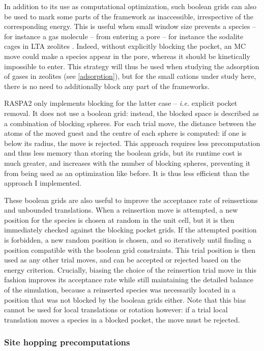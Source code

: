 \documentclass[main.tex]{subfiles}
\begin{document}
In addition to its use as computational optimization, such boolean grids can also be used to mark some parts of the framework as inaccessible, irrespective of the corresponding energy. This is useful when small window size prevents a species -- for instance a gas molecule -- from entering a pore -- for instance the sodalite cages in LTA zeolites \autocite{PoreBlocking}. Indeed, without explicitly blocking the pocket, an MC move could make a species appear in the pore, whereas it should be kinetically impossible to enter. This strategy will thus be used when studying the adsorption of gases in zeolites (see \cref{adsorption}), but for the small cations under study here, there is no need to additionally block any part of the frameworks.

RASPA2 only implements blocking for the latter case -- \textit{i.e.} explicit pocket removal. It does not use a boolean grid: instead, the blocked space is described as a combination of blocking spheres. For each trial move, the distance between the atoms of the moved guest and the centre of each sphere is computed: if one is below its radius, the move is rejected. This approach requires less precomputation and thus less memory than storing the boolean grids, but its runtime cost is much greater, and increases with the number of blocking spheres, preventing it from being used as an optimization like before. It is thus less efficient than the approach I implemented.

These boolean grids are also useful to improve the acceptance rate of reinsertions and unbounded translations. When a reinsertion move is attempted, a new position for the species is chosen at random in the unit cell, but it is then immediately checked against the blocking pocket grids. If the attempted position is forbidden, a new random position is chosen, and so iteratively until finding a position compatible with the boolean grid constraints. This trial position is then used as any other trial moves, and can be accepted or rejected based on the energy criterion. Crucially, biasing the choice of the reinsertion trial move in this fashion improves its acceptance rate while still maintaining the detailed balance of the simulation, because a reinserted species was necessarily located in a position that was not blocked by the boolean grids either. Note that this bias cannot be used for local translations or rotation however: if a trial local translation moves a species in a blocked pocket, the move must be rejected.

\subsubsection{Site hopping precomputations}
\end{document}
